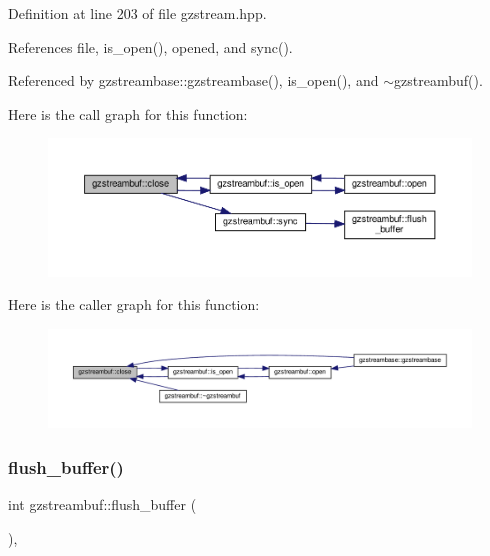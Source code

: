 Definition at line 203 of file gzstream.\+hpp.



References file, is\+\_\+open(), opened, and sync().



Referenced by gzstreambase\+::gzstreambase(), is\+\_\+open(), and $\sim$gzstreambuf().

Here is the call graph for this function\+:
\nopagebreak
\begin{figure}[H]
\begin{center}
\leavevmode
\includegraphics[width=350pt]{d7/de3/classgzstreambuf_ac47e68029383ac04ded54dedae5c930d_cgraph}
\end{center}
\end{figure}
Here is the caller graph for this function\+:
\nopagebreak
\begin{figure}[H]
\begin{center}
\leavevmode
\includegraphics[width=350pt]{d7/de3/classgzstreambuf_ac47e68029383ac04ded54dedae5c930d_icgraph}
\end{center}
\end{figure}
\mbox{\label{classgzstreambuf_a1f5ae8e8283961711376c1dbbaa1ee75}} 
\subsubsection{\texorpdfstring{flush\+\_\+buffer()}{flush\_buffer()}}
{\footnotesize\ttfamily int gzstreambuf\+::flush\+\_\+buffer (\begin{DoxyParamCaption}{ }\end{DoxyParamCaption})\hspace{0.3cm}{\ttfamily [inline]}, {\ttfamily [private]}}



